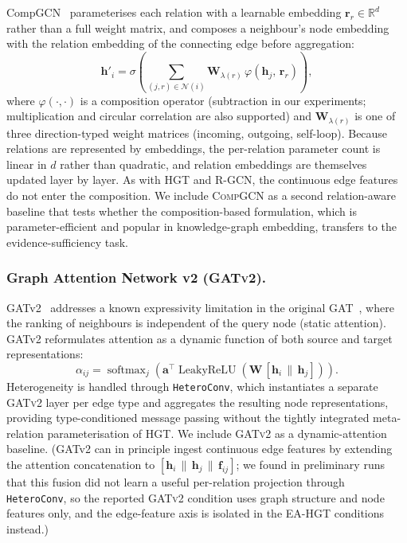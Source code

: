 \documentclass[a4,center]{NAR}
\newcommand{\hgt}{\textsc{HGT}}
\newcommand{\gatv}{\textsc{GATv2}}
\newcommand{\rgcn}{\textsc{R-GCN}}
\newcommand{\compgcn}{\textsc{CompGCN}}
\newcommand{\eahgt}{\textsc{EA-HGT}}
\newcommand{\concat}{\,\|\,}
\begin{document}
{CompGCN~\citep{Vashishth2020CompositionBased} parameterises each relation with
a learnable embedding $\mathbf{r}_r \in \mathbb{R}^d$ rather than a full weight
matrix, and composes a neighbour's node embedding with the relation embedding
of the connecting edge before aggregation:
\begin{equation}
    \mathbf{h}'_i = \sigma\!\left(
        \sum_{(j, r) \in \mathcal{N}(i)}
            \mathbf{W}_{\lambda(r)}\,
            \varphi\!\left(\mathbf{h}_j,\, \mathbf{r}_r\right)
    \right),
    \label{eq:compgcn}
\end{equation}
where $\varphi(\cdot,\cdot)$ is a composition operator (subtraction in our
experiments; multiplication and circular correlation are also supported) and
$\mathbf{W}_{\lambda(r)}$ is one of three direction-typed weight matrices
(incoming, outgoing, self-loop). Because relations are represented by
embeddings, the per-relation parameter count is linear in $d$ rather than
quadratic, and relation embeddings are themselves updated layer by layer.
As with \hgt{} and \rgcn{}, the continuous edge features do not enter the
composition. We include \compgcn{} as a second relation-aware baseline that
tests whether the composition-based formulation, which is parameter-efficient
and popular in knowledge-graph embedding, transfers to the evidence-sufficiency
task.

\subsubsection{Graph Attention Network v2 (\gatv{}).}
\label{sec:gatv2}

GATv2~\citep{Brody2021HowNetworks} addresses a known expressivity limitation in the
original GAT~\citep{Velickovic2017GraphNetworks}, where the ranking of neighbours is
independent of the query node (static attention). GATv2 reformulates attention
as a dynamic function of both source and target representations:
\begin{equation}
    \alpha_{ij} = \operatorname{softmax}_{j}\!\left(
        \mathbf{a}^\top \operatorname{LeakyReLU}\!\left(
            \mathbf{W}\,[\mathbf{h}_i \concat \mathbf{h}_j]
        \right)
    \right).
    \label{eq:gatv2-base}
\end{equation}
Heterogeneity is handled through \texttt{HeteroConv}, which instantiates a
separate \gatv{} layer per edge type and aggregates the resulting node
representations, providing type-conditioned message passing without the
tightly integrated meta-relation parameterisation of \hgt{}. We include
\gatv{} as a dynamic-attention baseline. (GATv2 can in principle ingest
continuous edge features by extending the attention concatenation to
$[\mathbf{h}_i \concat \mathbf{h}_j \concat \mathbf{f}_{ij}]$; we found
in preliminary runs that this fusion did not learn a useful per-relation
projection through \texttt{HeteroConv}, so the reported \gatv{} condition
uses graph structure and node features only, and the edge-feature axis is
isolated in the \eahgt{} conditions instead.)


}
\end{document}
